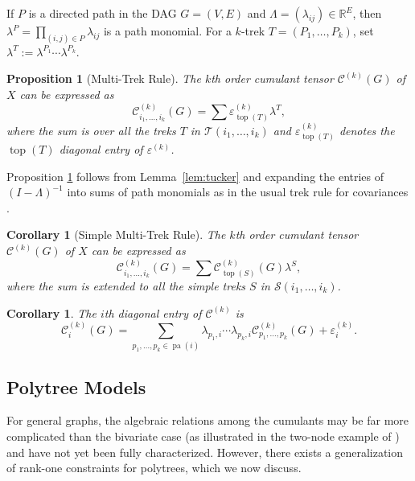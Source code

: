 \documentclass[11pt,a4paper]{article}
\numberwithin{equation}{section}
\newtheorem{proposition}[theorem]{Proposition}
\newtheorem{corollary}[theorem]{Corollary}
\DeclareMathOperator{\pa}{pa}
\DeclareMathOperator{\ttop}{top}
\begin{document}
If $P$ is a directed path in the DAG $G=(V,E)$ and $\Lambda=(\lambda_{ij})\in\mathbb{R}^E$, then $\lambda^P=\prod_{(i,j)\in P}\lambda_{ij}$ is a path monomial. 
For a $k$-trek $T=(P_1,\dots,P_k)$, set $\lambda^T:=\lambda^{P_1}\cdots\lambda^{P_k}$. 

\begin{proposition}[Multi-Trek Rule]
\label{prop:multi:trek}
The $k$th order cumulant tensor $\mathcal{C}^{(k)}(G)$ of $X$ can be expressed as
\begin{equation}
\label{eq:trek}
    \mathcal{C}^{(k)}_{i_1,\dots,i_k}(G)=\sum\varepsilon^{(k)}_{\ttop(T)}\lambda^T,
\end{equation}
where the sum is over all the treks $T$ in $\mathcal{T}(i_1,\dots,i_k)$ and $\varepsilon^{(k)}_{\ttop(T)}$ denotes the $\ttop(T)$ diagonal entry of $\varepsilon^{(k)}$.
\end{proposition}

Proposition \ref{prop:multi:trek} follows from Lemma~\ref{lem:tucker} and expanding the entries of $(I-\Lambda)^{-1}$ into sums of path monomials as in the usual trek rule for covariances \citep{robeva:2021}.

\begin{corollary}[Simple Multi-Trek Rule]
\label{cor:simple-trek-rule}
The $k$th order cumulant tensor $\mathcal{C}^{(k)}(G)$ of $X$ can be expressed as
\begin{equation}
    \mathcal{C}^{(k)}_{i_1,\dots,i_k}(G)=\sum \mathcal{C}^{(k)}_{\ttop(S)}(G)\lambda^{S},
\end{equation}
where the sum is extended to all the simple treks $S$ in $\mathcal{S}(i_1,\dots,i_k)$.
\end{corollary}

\begin{corollary}
\label{cor:simple_trek_2}
The $i$th diagonal entry of $\mathcal{C}^{(k)}$ is
\begin{equation*}
     \mathcal{C}^{(k)}_{i}(G)=\displaystyle\sum_{p_1,\dots,p_k\in \pa(i)}\lambda_{p_1, i}\cdots\lambda_{p_k,i}\mathcal{C}^{(k)}_{p_1,\dots,p_k}(G)+\varepsilon^{(k)}_i.
\end{equation*}
\end{corollary}

\subsection{Polytree Models}
\label{subsec:polytree-models}
For general graphs, the algebraic relations among the cumulants may be far more complicated than the bivariate case (as illustrated in the two-node example of \citet[Example A.1]{tramontano:monod:drton:2022}) and have not yet been fully characterized. However, there exists a generalization of rank-one constraints for polytrees, which we now discuss.
\end{document}
